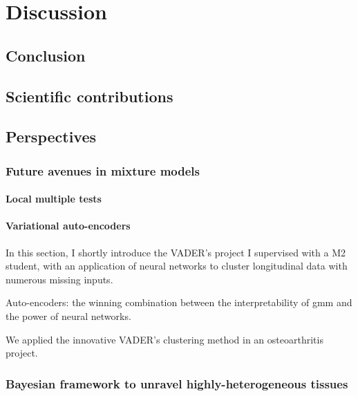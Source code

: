 \chapter{Discussion}

\section{Conclusion}

\section{Scientific contributions}

\section{Perspectives}
\subsection{Future avenues in mixture models}

\subsubsection{Local multiple tests}

\subsubsection{Variational auto-encoders}

In this section, I shortly introduce the VADER's project I supervised with a M2 student, with an application of neural networks to cluster longitudinal data with numerous missing inputs. 

Auto-encoders: the winning combination between the interpretability of \gls{gmm} and the power of neural networks.

We applied the innovative VADER's clustering method in an osteoarthritis project.

\subsection{Bayesian framework to unravel highly-heterogeneous tissues}